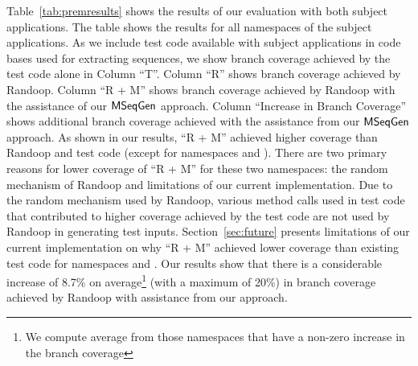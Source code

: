 Table~\ref{tab:premresults} shows the results of our evaluation with both subject applications. The table shows the results for all namespaces of the subject applications. As we include test code available with subject applications in code bases used for extracting sequences, we show branch coverage achieved by the test code alone in Column ``T''. Column ``R'' shows branch coverage achieved by Randoop. Column ``R + M'' shows branch coverage achieved by Randoop with the assistance of our $\textsf{MSeqGen} $ approach. Column ``Increase in Branch Coverage'' shows additional branch coverage achieved with the assistance from our $\textsf{MSeqGen} $ approach. As shown in our results, ``R + M'' achieved higher coverage than Randoop and test code (except for namespaces  and ). There are two primary reasons for lower coverage of ``R + M'' for these two namespaces: the random mechanism of Randoop and limitations of our current implementation. Due to the random mechanism used by Randoop, various method calls used in test code that contributed to higher coverage achieved by the test code are not used by Randoop in generating test inputs. Section~\ref{sec:future} presents limitations of our current implementation on why ``R + M'' achieved lower coverage than existing test code for namespaces  and . Our results show that there is a considerable increase of 8.7\% on average\footnote{We compute average from those namespaces that have a non-zero increase in the branch coverage} (with a maximum of 20\%) in branch coverage achieved by Randoop with assistance from our approach. 

